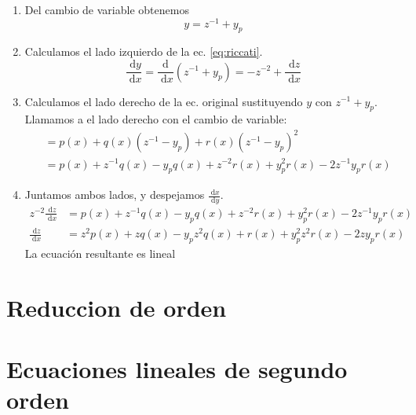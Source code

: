 \documentclass[a4paper]{article}
\newcommand{\dif}[1]{\;\mathrm{d}#1}
\begin{document}
\begin{enumerate}
    \item Del cambio de variable obtenemos
    \begin{equation*}
        y = z^{-1} + y_{p}
    \end{equation*}

    \item Calculamos el lado izquierdo de la ec. \eqref{eq:riccati}.
    \begin{equation*}
        \frac{\dif{y}}{\dif{x}} = \frac{\mathrm{d}}{\dif{x}} \left( z^{-1} + y_p \right) = -z^{-2} + \frac{\dif{z}}{\dif{x}}
    \end{equation*}

    \item Calculamos el lado derecho de la ec. original sustituyendo $y$ con $z^{-1} + y_p$.
    Llamamos a el lado derecho con el cambio de variable:
    \begin{align*}
       &= p(x) + q(x) (z^{-1} - y_p) + r(x) (z^{-1} - y_p)^{2} \\
       &= p(x) + z^{-1} q(x) - y_p q(x) + z^{-2} r(x) + y^{2}_{p} r(x) - 2 z^{-1} y_p r(x)
    \end{align*}

    \item Juntamos ambos lados, y despejamos $\frac{\dif{x}}{\dif{y}}$.
    \begin{align*}
        z^{-2}  \frac{\dif{z}}{\dif{x}} &= p(x) + z^{-1} q(x) - y_p q(x) + z^{-2} r(x) + y^{2}_{p} r(x) - 2 z^{-1} y_p r(x) \\
        \frac{\dif{z}}{\dif{x}} &= z^{2} p(x) + z q(x) - y_p z^{2} q(x) + r(x) + y^{2}_{p} z^{2} r(x) - 2 z y_p r(x)
    \end{align*}
    La ecuación resultante es lineal
\end{enumerate}

\section{Reduccion de orden}%
\label{sec:reduccion_de_orden}

\section{Ecuaciones lineales de segundo orden}%
\label{sec:ecuaciones_lineales_de_segundo_orden}
\end{document}
